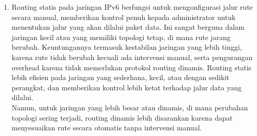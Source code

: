 \begin{enumerate}
    \item Routing statis pada jaringan IPv6 berfungsi untuk mengonfigurasi jalur rute secara manual, memberikan kontrol penuh kepada administrator untuk menentukan jalur yang akan dilalui paket data. Ini sangat berguna dalam jaringan kecil atau yang memiliki topologi tetap, di mana rute jarang berubah. Keuntungannya termasuk kestabilan jaringan yang lebih tinggi, karena rute tidak berubah kecuali ada intervensi manual, serta pengurangan overhead karena tidak memerlukan protokol routing dinamis. Routing statis lebih efisien pada jaringan yang sederhana, kecil, atau dengan sedikit perangkat, dan memberikan kontrol lebih ketat terhadap jalur data yang dilalui.\\
    Namun, untuk jaringan yang lebih besar atau dinamis, di mana perubahan topologi sering terjadi, routing dinamis lebih disarankan karena dapat menyesuaikan rute secara otomatis tanpa intervensi manual.
\end{enumerate}

